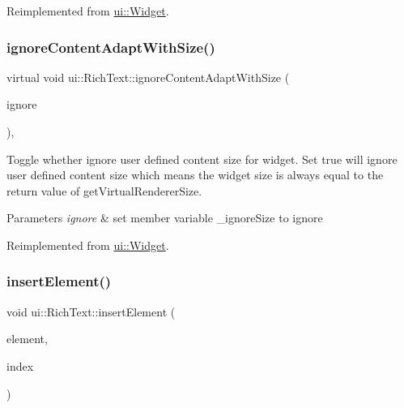 Reimplemented from \hyperlink{classui_1_1Widget_a47ec556e48f2ac20290c197e30434d36}{ui\+::\+Widget}.

\mbox{\label{classui_1_1RichText_a82b3965a42f134415afab5605ef73ffa}} 
\subsubsection{\texorpdfstring{ignore\+Content\+Adapt\+With\+Size()}{ignoreContentAdaptWithSize()}\hspace{0.1cm}{\footnotesize\ttfamily [2/2]}}
{\footnotesize\ttfamily virtual void ui\+::\+Rich\+Text\+::ignore\+Content\+Adapt\+With\+Size (\begin{DoxyParamCaption}\item[{bool}]{ignore }\end{DoxyParamCaption})\hspace{0.3cm}{\ttfamily [override]}, {\ttfamily [virtual]}}

Toggle whether ignore user defined content size for widget. Set true will ignore user defined content size which means the widget size is always equal to the return value of {\ttfamily get\+Virtual\+Renderer\+Size}.


\begin{DoxyParams}{Parameters}
{\em ignore} & set member variable \+\_\+ignore\+Size to ignore \\
\hline
\end{DoxyParams}


Reimplemented from \hyperlink{classui_1_1Widget_a47ec556e48f2ac20290c197e30434d36}{ui\+::\+Widget}.

\mbox{\label{classui_1_1RichText_a60507d7854a4d1ac99722d9c0ff5237b}} 
\subsubsection{\texorpdfstring{insert\+Element()}{insertElement()}\hspace{0.1cm}{\footnotesize\ttfamily [1/2]}}
{\footnotesize\ttfamily void ui\+::\+Rich\+Text\+::insert\+Element (\begin{DoxyParamCaption}\item[{\hyperlink{classui_1_1RichElement}{Rich\+Element} $\ast$}]{element,  }\item[{int}]{index }\end{DoxyParamCaption})}



